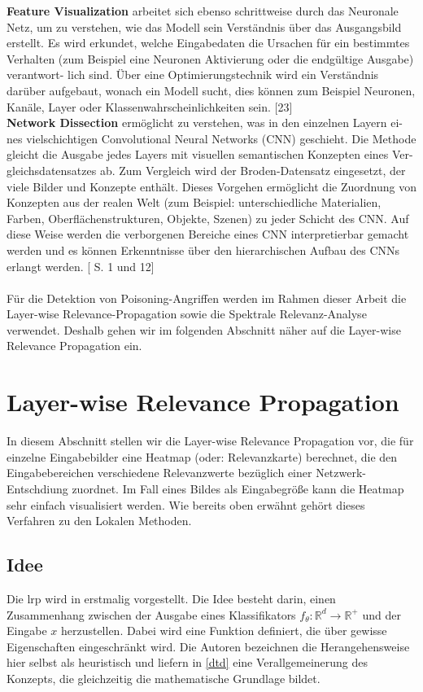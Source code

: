 \documentclass[11pt,a4paper]{article}
\numberwithin{equation}{section}
\begin{document}
	\noindent \textbf{Feature Visualization} arbeitet sich ebenso schrittweise durch das Neuronale Netz,
	um zu verstehen, wie das Modell sein Verständnis über das Ausgangsbild erstellt.
	Es wird erkundet, welche Eingabedaten die Ursachen für ein bestimmtes Verhalten
	(zum Beispiel eine Neuronen Aktivierung oder die endgültige Ausgabe) verantwort-
	lich sind. Über eine Optimierungstechnik wird ein Verständnis darüber aufgebaut,
	wonach ein Modell sucht, dies können zum Beispiel Neuronen, Kanäle, Layer oder
	Klassenwahrscheinlichkeiten sein. [23]\\
	
	
	\noindent \textbf{Network Dissection} ermöglicht zu verstehen, was in den einzelnen Layern ei-
	nes vielschichtigen Convolutional Neural Networks (CNN) geschieht. Die Methode
	gleicht die Ausgabe jedes Layers mit visuellen semantischen Konzepten eines Ver-
	gleichsdatensatzes ab. Zum Vergleich wird der Broden-Datensatz eingesetzt, der
	viele Bilder und Konzepte enthält. Dieses Vorgehen ermöglicht die Zuordnung von
	Konzepten aus der realen Welt (zum Beispiel: unterschiedliche Materialien, Farben,
	Oberflächenstrukturen, Objekte, Szenen) zu jeder Schicht des CNN. Auf diese Weise
	werden die verborgenen Bereiche eines CNN interpretierbar gemacht werden und es
	können Erkenntnisse über den hierarchischen Aufbau des CNNs erlangt werden. \cite{networkdissection}[
	S. 1 und 12]\\
	\\
	Für die Detektion von Poisoning-Angriffen werden im Rahmen dieser Arbeit die Layer-wise Relevance-Propagation sowie die Spektrale Relevanz-Analyse verwendet. Deshalb gehen wir im folgenden Abschnitt näher auf die Layer-wise Relevance Propagation ein.
	
	\section{Layer-wise Relevance Propagation} \label{chapter_lrp}
	
	
	
	In diesem Abschnitt stellen wir die Layer-wise Relevance Propagation vor, die für einzelne Eingabebilder eine Heatmap (oder: Relevanzkarte) berechnet, die den Eingabebereichen verschiedene Relevanzwerte bezüglich einer Netzwerk-Entschdiung zuordnet. Im Fall eines Bildes als Eingabegröße kann die Heatmap sehr einfach visualisiert werden. Wie bereits oben erwähnt gehört dieses Verfahren zu den Lokalen Methoden.
	
	
	\subsection{Idee}
	Die \gls{lrp} wird in \cite{LRP_first_paper} erstmalig vorgestellt. Die Idee besteht darin, einen Zusammenhang zwischen der Ausgabe eines Klassifikators $f_{\theta}: \mathbb{R}^d\to \mathbb{R^{+}}$ und der Eingabe $x$ herzustellen. Dabei wird eine Funktion definiert, die über gewisse Eigenschaften eingeschränkt wird. Die Autoren bezeichnen die Herangehensweise hier selbst als heuristisch und liefern in \ref{dtd} eine Verallgemeinerung des Konzepts, die gleichzeitig die mathematische Grundlage bildet.\\
	
\end{document}
